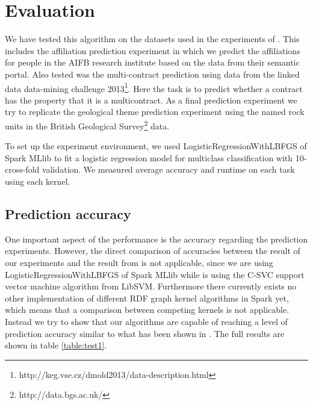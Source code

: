 \documentclass{easychair}
\begin{document}
\section{Evaluation}
\label{sect:Evaluation}

We have tested this algorithm on the datasets used in the experiments of \cite{FGK}. This includes the affiliation prediction experiment in which we predict the affiliations for people in the AIFB research institute based on the data from their semantic portal. Also tested was the multi-contract prediction using data from the linked data data-mining challenge 2013\footnote{http://keg.vse.cz/dmold2013/data-description.html}. Here the task is to predict whether a contract has the property that it is a multicontract. As a final prediction experiment we try to replicate the geological theme prediction experiment using the named rock units in the British Geological Survey\footnote{http://data.bgs.ac.uk/} data.

To set up the experiment environment, we used LogisticRegressionWithLBFGS of Spark MLlib to fit a logistic regression model for multiclass classification with 10-cross-fold validation. We measured average accuracy and runtime on each task using each kernel.

\subsection{Prediction accuracy}
One important aspect of the performance is the accuracy regarding the prediction experiments. However, the direct comparison of accuracies between the result of our experiments and the result from \cite{FGK} is not applicable, since we are using LogisticRegressionWithLBFGS of Spark MLlib while \cite{FGK} is using the C-SVC support vector machine algorithm from LibSVM. Furthermore there currently exists no other implementation of different RDF graph kernel algorithms in Spark yet, which means that a comparison between competing kernels is not applicable. Instead we try to show that our algorithms are capable of reaching a level of prediction accuracy similar to what has been shown in \cite{FGK}. The full results are shown in table \ref{table:test1}.
\end{document}
